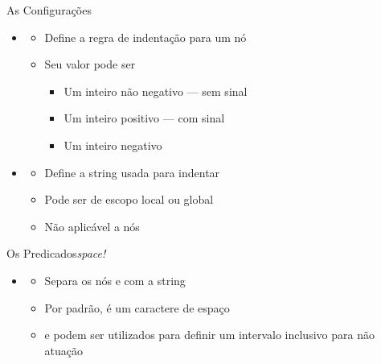 \documentclass
  [ aspectratio=169,
    english,
    hyperref={citecolor=blue,colorlinks=true,linkcolor=blue,urlcolor=blue},
    brazil]
  {beamer}
\begin{document}

  \begin{frame}[fragile]{As Configurações}
    \begin{itemize}
      \item {}
            \begin{itemize}
              \item Define a regra de indentação para um nó
              \item Seu valor pode ser
                    \begin{itemize}
                      \item Um inteiro não negativo --- sem sinal
                      \item Um inteiro positivo --- com sinal
                      \item Um inteiro negativo
                    \end{itemize}
            \end{itemize}
      \item {}
            \begin{itemize}
              \item Define a string usada para indentar
              \item Pode ser de escopo local ou global
              \item Não aplicável a nós
            \end{itemize}
    \end{itemize}
  \end{frame}



  \begin{frame}[fragile]{Os Predicados}{\textit{space!}}
    \begin{itemize}
      \item {}
            \begin{itemize}
              \item Separa os nós  e 
                    com a string 
              \item Por padrão,  é um caractere de
                    espaço
              \item {} e  podem
                    ser utilizados para definir um intervalo inclusivo para não
                    atuação
            \end{itemize} \end{itemize}
  \end{frame}
\end{document}
